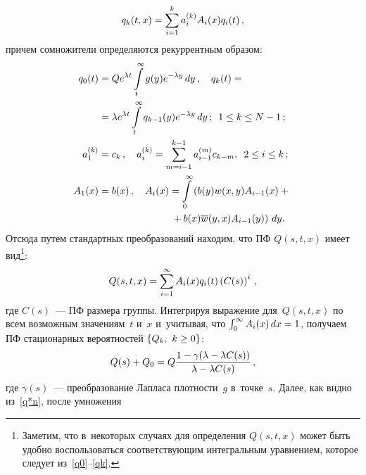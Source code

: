 \begin{multicols}{2}
\noindent
$$q_k(t,x) \hm=\sum\limits_{i=1}^k a^{(k)}_i A_i(x)q_i(t)\,,
$$
причем сомножители определяются рекуррентным образом:
\begin{align*}
q_0(t)
&=
Q e^{\lambda t} \int\limits_t^\infty g(y) e^{- \lambda y}\,dy\,,\quad
q_k(t) ={}\\
{}&= \lambda e^{\lambda t} \int\limits_t^\infty q_{k-1}(y) e^{- \lambda y}\,dy\,; 
\enskip 1 \le k \le N-1\,;
\\
a^{(k)}_1
&=c_k\,, \quad  a^{(k)}_i = \sum\limits_{m=i-1}^{k-1}
a^{(m)}_{i-1} c_{k-m}, \enskip 2 \le i \le k\,;
\\ 
A_1(x) &=
b(x)\,, \quad
A_i(x)=
\int\limits_0^\infty \left ( b(y) w(x,y)
 A_{i-1}(x) +{}\right.\\
& \hspace*{25mm}\left.{}+ b(x) \overline{w}(y,x)  A_{i-1}(y) \right )\,
dy.
\end{align*}
Отсюда путем стандартных преобразований находим, что
ПФ $Q(s,t,x)$ имеет вид\footnote{Заметим, что в~некоторых случаях для
определения $Q(s,t,x)$ может быть удобно 
воспользоваться соответствующим интегральным уравнением, 
которое следует из~\eqref{q0}--\eqref{qk}.}:
$$Q(s,t,x)\hm= \sum\limits_{i=1}^\infty A_i(x) q_i(t) 
\left (C(s) \right )^{i}\,,
$$
где $C(s)$~--- ПФ размера группы. Интегрируя выражение для~$Q(s,t,x)$ 
по всем возможным значениям~$t$ и~$x$ 
и~учитывая, что $\int\nolimits_0^\infty A_i(x)\, dx\hm=1$, получаем 
ПФ стационарных вероятностей ${\{ Q_k, \ k \hm\ge 0 \}}$:
\begin{equation}
\label{Qs}
Q(s)+Q_0= Q \displaystyle\frac{\displaystyle  1 - \gamma (\lambda - \lambda C(s) )\mathstrut}{\displaystyle \lambda  - \lambda C(s)\mathstrut}\,,
\end{equation}
где $\gamma(s)$~--- преобразование Лапласа плотности~$g$ в~точке~$s$. 
Далее, как видно из~\eqref{q*n}, после умножения\linebreak
\vspace*{-12pt}

\pagebreak 


\end{multicols}
